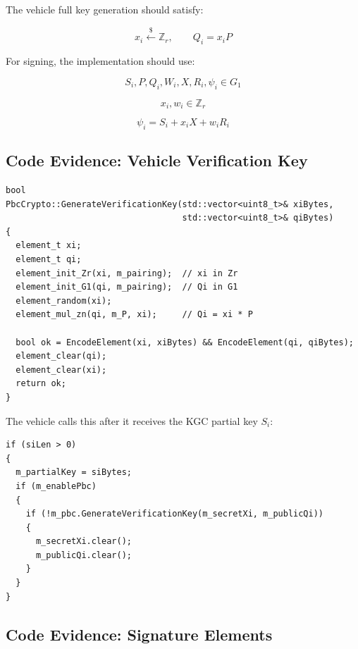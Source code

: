 \documentclass[11pt,a4paper]{article}
\begin{document}
The vehicle full key generation should satisfy:

\[
  x_i \xleftarrow{\$} \mathbb{Z}_r, \qquad Q_i=x_iP
\]

For signing, the implementation should use:

\[
  S_i,P,Q_i,W_i,X,R_i,\psi_i \in G_1
\]

\[
  x_i,w_i \in \mathbb{Z}_r
\]

\[
  \psi_i = S_i + x_iX + w_iR_i
\]

\subsection{Code Evidence: Vehicle Verification Key}

\begin{lstlisting}[style=cppstyle,caption={Vehicle xi is sampled in Zr and Qi is computed in G1.}]
bool
PbcCrypto::GenerateVerificationKey(std::vector<uint8_t>& xiBytes,
                                   std::vector<uint8_t>& qiBytes)
{
  element_t xi;
  element_t qi;
  element_init_Zr(xi, m_pairing);  // xi in Zr
  element_init_G1(qi, m_pairing);  // Qi in G1
  element_random(xi);
  element_mul_zn(qi, m_P, xi);     // Qi = xi * P

  bool ok = EncodeElement(xi, xiBytes) && EncodeElement(qi, qiBytes);
  element_clear(qi);
  element_clear(xi);
  return ok;
}
\end{lstlisting}

The vehicle calls this after it receives the KGC partial key \(S_i\):

\begin{lstlisting}[style=cppstyle,caption={Vehicle generates Qi after receiving partial key.}]
if (siLen > 0)
{
  m_partialKey = siBytes;
  if (m_enablePbc)
  {
    if (!m_pbc.GenerateVerificationKey(m_secretXi, m_publicQi))
    {
      m_secretXi.clear();
      m_publicQi.clear();
    }
  }
}
\end{lstlisting}

\subsection{Code Evidence: Signature Elements}
\end{document}

